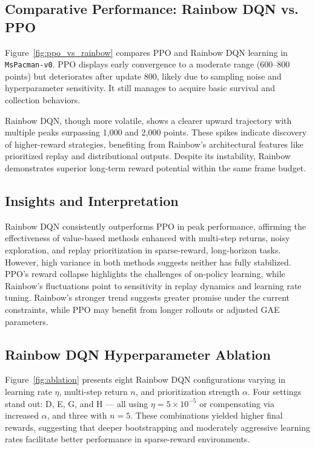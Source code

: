 \documentclass{article}
\begin{document}
\subsection{Comparative Performance: Rainbow DQN vs. PPO}

Figure~\ref{fig:ppo_vs_rainbow} compares PPO and Rainbow DQN learning in \texttt{MsPacman-v0}. PPO displays early convergence to a moderate range (600–800 points) but deteriorates after update 800, likely due to sampling noise and hyperparameter sensitivity. It still manages to acquire basic survival and collection behaviors.

Rainbow DQN, though more volatile, shows a clearer upward trajectory with multiple peaks surpassing 1,000 and 2,000 points. These spikes indicate discovery of higher-reward strategies, benefiting from Rainbow’s architectural features like prioritized replay and distributional outputs. Despite its instability, Rainbow demonstrates superior long-term reward potential within the same frame budget.

\subsection{Insights and Interpretation}

Rainbow DQN consistently outperforms PPO in peak performance, affirming the effectiveness of value-based methods enhanced with multi-step returns, noisy exploration, and replay prioritization in sparse-reward, long-horizon tasks. However, high variance in both methods suggests neither has fully stabilized. PPO’s reward collapse highlights the challenges of on-policy learning, while Rainbow’s fluctuations point to sensitivity in replay dynamics and learning rate tuning. Rainbow’s stronger trend suggests greater promise under the current constraints, while PPO may benefit from longer rollouts or adjusted GAE parameters.

\subsection{Rainbow DQN Hyperparameter Ablation}

Figure~\ref{fig:ablation} presents eight Rainbow DQN configurations varying in learning rate \(\eta\), multi-step return \(n\), and prioritization strength \(\alpha\). Four settings stand out: D, E, G, and H — all using \(\eta = 5 \times 10^{-5}\) or compensating via increased \(\alpha\), and three with \(n = 5\). These combinations yielded higher final rewards, suggesting that deeper bootstrapping and moderately aggressive learning rates facilitate better performance in sparse-reward environments.
\end{document}
